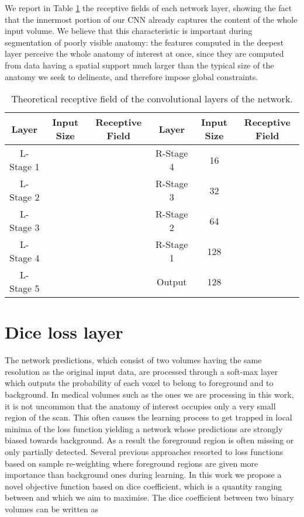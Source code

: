\documentclass{llncs}
\begin{document}
We report in Table \ref{table:receptiveFields} the receptive fields of each network layer, showing the fact that the innermost portion of our CNN already captures the content of the whole input volume. We believe that this characteristic is important during segmentation of poorly visible anatomy: the features computed in the deepest layer perceive the whole anatomy of interest at once, since they are computed from data having a spatial support much larger than the typical size of the anatomy we seek to delineate, and therefore impose global constraints.

\begin{table}
\begin{centering}
\protect\caption{Theoretical receptive field of the  convolutional layers of the network.} 
\begin{tabular}{|c|c|c||c|c|c|}
\hline 
Layer & Input Size & Receptive Field & Layer & Input Size & Receptive Field\tabularnewline
\hline 
\hline 
L-Stage 1 &  &  & R-Stage 4 & 16 & \tabularnewline
\hline 
L-Stage 2 &  &  & R-Stage 3 & 32 & \tabularnewline
\hline 
L-Stage 3 &  &  & R-Stage 2 & 64 & \tabularnewline
\hline 
L-Stage 4 &  &  & R-Stage 1 & 128 & \tabularnewline
\hline 
L-Stage 5 &  &  & Output & 128 & \textbf{}\tabularnewline
\hline 
\end{tabular} \label{table:receptiveFields}
\par\end{centering}
\end{table}

\section{Dice loss layer}
The network predictions, which consist of two volumes having the same resolution as the original input data, are processed through a soft-max layer which outputs the probability of each voxel to belong to foreground and to background. In medical volumes such as the ones we are processing in this work, it is not uncommon that the anatomy of interest occupies only a very small region of the scan. This often causes the learning process to get trapped in local minima of the loss function yielding a network whose predictions are strongly biased towards background. As a result the foreground region is often missing or only partially detected. Several previous approaches resorted to loss functions based on sample re-weighting where foreground regions are given more importance than background ones during learning. In this work we propose a novel objective function based on dice coefficient, which is a quantity ranging between  and  which we aim to maximise. The dice coefficient  between two binary volumes can be written as
\end{document}
